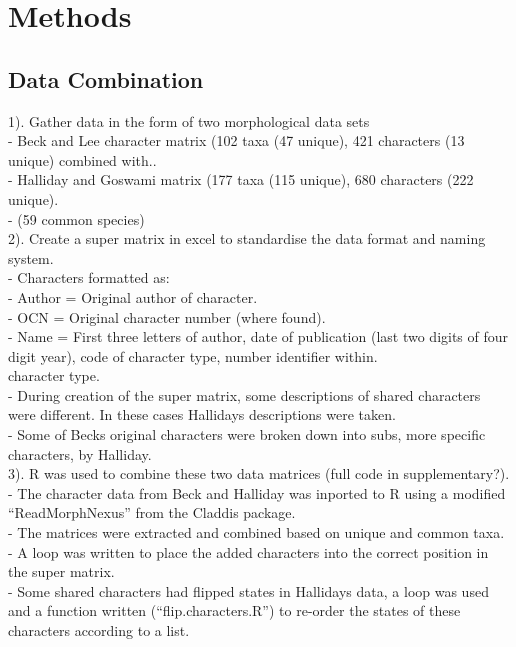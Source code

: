 \documentclass[a4paper,11pt]{article}
\begin{document}
\section{Methods}

\subsection{Data Combination}

1). Gather data in the form of two morphological data sets \\
 - Beck and Lee character matrix \citep{beck2014ancient} (102 taxa (47 unique), 421 characters (13 unique) combined with..\\  
 - Halliday and Goswami matrix \citep{halliday2016eutherian} (177 taxa (115 unique), 680 characters (222 unique).\\ 
 - (59 common species)\\

2). Create a super matrix in excel to standardise the data format and naming system.\\
 - Characters formatted as: \\
 - Author = Original author of character.\\
 - OCN = Original character number (where found).\\
 - Name = First three letters of author, date of publication (last two digits of four digit year), code of character type, number identifier within.\\ character type. \\ 
 - During creation of the super matrix, some descriptions of shared characters were different. In these cases Hallidays descriptions were taken.\\
 - Some of Becks original characters were broken down into subs, more specific characters, by Halliday.\\

3). R was used to combine these two data matrices (full code in supplementary?).\\
 - The character data from Beck and Halliday was inported to R using a modified ``ReadMorphNexus'' from the Claddis package.\\
 - The matrices were extracted and combined based on unique and common taxa.\\
 - A loop was written to place the added characters into the correct position in the super matrix.\\
 - Some shared characters had flipped states in Hallidays data, a loop was used and a function written (``flip.characters.R'') to re-order the states of these characters according to a list.\\
\end{document}
